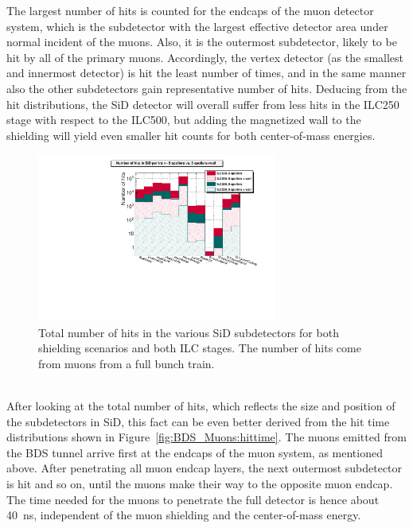 The largest number of hits is counted for the endcaps of the muon detector system, which is the subdetector with the largest effective detector area under normal incident of the muons.
Also, it is the outermost subdetector, likely to be hit by all of the primary muons.
Accordingly, the vertex detector (as the smallest and innermost detector) is hit the least number of times, and in the same manner also the other subdetectors gain representative number of hits.
Deducing from the hit distributions, the SiD detector will overall suffer from less hits in the ILC250 stage with respect to the ILC500, but adding the magnetized wall to the shielding will yield even smaller hit counts for both center-of-mass energies.
\begin{figure}[h]
\centering
\includegraphics[width=0.7\textwidth]{Figures/BDS_muons/Hits_in_SiD_subdetectors_MuonSpoilerStudy.pdf}
\caption[Number of muon hits in the SiD subdetectors]{Total number of hits in the various SiD subdetectors for both shielding scenarios and both ILC stages.
The number of hits come from muons from a full bunch train.}
\label{fig:BDS_Muons:hits}
\end{figure}
\\After looking at the total number of hits, which reflects the size and position of the subdetectors in SiD, this fact can be even better derived from the hit time distributions shown in Figure~\ref{fig:BDS_Muons:hittime}.
The muons emitted from the BDS tunnel arrive first at the endcaps of the muon system, as mentioned above.
After penetrating all muon endcap layers, the next outermost subdetector is hit and so on, until the muons make their way to the opposite muon endcap.
The time needed for the muons to penetrate the full detector is hence about \SI{40}{\nano\second}, independent of the muon shielding and the center-of-mass energy.
